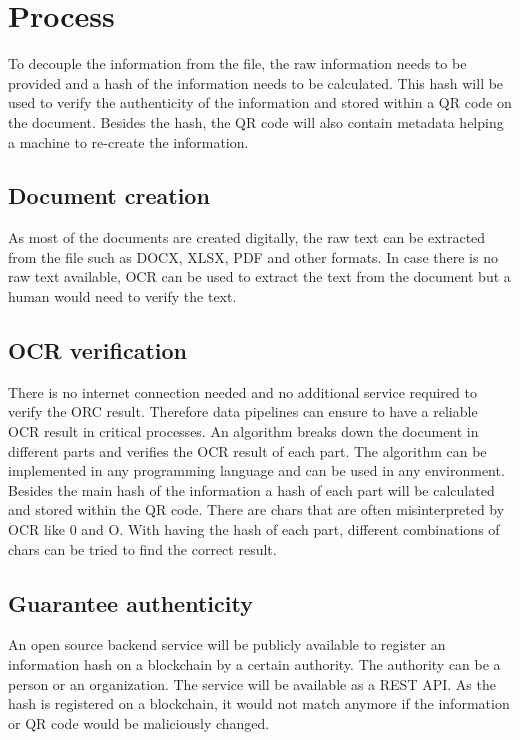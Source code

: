 \documentclass[../ockr-specification.tex]{subfiles}
\begin{document}
\section{Process}

To decouple the information from the file, the raw information needs to be provided and a hash of the information needs to be calculated. This hash will be used to verify the authenticity of the information and stored within a QR code on the document. Besides the hash, the QR code will also contain metadata helping a machine to re-create the information.

\subsection{Document creation}

As most of the documents are created digitally, the raw text can be extracted from the file such as DOCX, XLSX, PDF and other formats. In case there is no raw text available, OCR can be used to extract the text from the document but a human would need to verify the text.

\subsection{OCR verification}

There is no internet connection needed and no additional service required to verify the ORC result. Therefore data pipelines can ensure to have a reliable OCR result in critical processes. An algorithm breaks down the document in different parts and verifies the OCR result of each part. The algorithm can be implemented in any programming language and can be used in any environment. Besides the main hash of the information a hash of each part will be calculated and stored within the QR code. There are chars that are often misinterpreted by OCR like 0 and O. With having the hash of each part, different combinations of chars can be tried to find the correct result.

\subsection{Guarantee authenticity}

An open source backend service will be publicly available to register an information hash on a blockchain by a certain authority. The authority can be a person or an organization. The service will be available as a REST API. As the hash is registered on a blockchain, it would not match anymore if the information or QR code would be maliciously changed.
\end{document}
